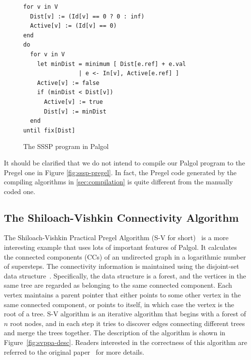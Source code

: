 \documentclass{sokendai_thesis} %
\begin{document}
\begin{figure}[thp]
\begin{lstlisting}[basicstyle=\small\ttfamily,xleftmargin=0.1\textwidth]
for v in V
  Dist[v] := (Id[v] == 0 ? 0 : inf)
  Active[v] := (Id[v] == 0)
end
do
  for v in V
    let minDist = minimum [ Dist[e.ref] + e.val
                | e <- In[v], Active[e.ref] ]
    Active[v] := false
    if (minDist < Dist[v])
      Active[v] := true
      Dist[v] := minDist
  end
until fix[Dist]
\end{lstlisting}
\vspace{-2ex}
\caption{The SSSP program in Palgol}
\label{fig:sssp-palgol}
\end{figure}


It should be clarified that we do not intend to compile our Palgol program to the Pregel one in Figure \ref{fig:sssp-pregel}.
In fact, the Pregel code generated by the compiling algorithms in \autoref{sec:compilation} is quite different from the manually coded one.

\subsection{The Shiloach-Vishkin Connectivity Algorithm}
\label{sec:svppa}

The Shiloach-Vishkin Practical Pregel Algorithm (S-V for short)~\cite{connectivity} is a more interesting example that uses lots of important features of Palgol.
It calculates the connected components (CCs) of an undirected graph in a logarithmic 
number of supersteps.
The connectivity information is maintained using the disjoint-set data structure~\cite{disjointset}.
Specifically, the data structure is a forest, and the vertices in the same tree are regarded as belonging to the same connected component.
Each vertex maintains a parent pointer that either points to some other vertex in the same connected component, or points to itself, in which case the vertex is the root of a tree.
S-V algorithm is an iterative algorithm that begins with a forest of $n$ root nodes, and in each step it tries to discover edges connecting different trees and merge the trees together.
The description of the algorithm is shown in Figure~\ref{fig:svppa-desc}.
Readers interested in the correctness of this algorithm are referred to the original paper~\cite{connectivity} for more details.
\end{document}
